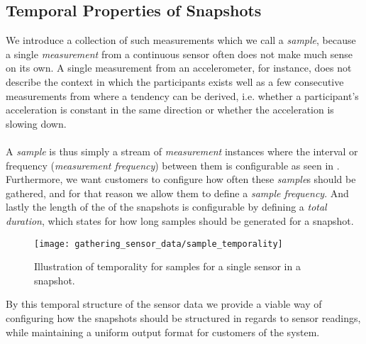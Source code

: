 
\subsection{Temporal Properties of Snapshots}
\label{sec:temporal_properties_of_snapshots}



We introduce a collection of such measurements which we call a \emph{sample}, because a single \emph{measurement} from a continuous sensor often does not make much sense on its own. A single measurement from an accelerometer, for instance, does not describe the context in which the participants exists well as a few consecutive measurements from where a tendency can be derived, i.e. whether a participant's acceleration is constant in the same direction or whether the acceleration is slowing down.
\\\\
A \emph{sample} is thus simply a stream of \emph{measurement} instances where the interval or frequency (\emph{measurement frequency}) between them is configurable as seen in . Furthermore, we want customers to configure how often these \emph{sample}s should be gathered, and for that reason we allow them to define a \emph{sample frequency}. And lastly the length of the of the snapshots is configurable by defining a \emph{total duration}, which states for how long samples should be generated for a snapshot.

\begin{figure}[!htbp]
    \centering
    \texttt{[image: gathering\_sensor\_data/sample\_temporality]}
    \caption{Illustration of temporality for samples for a single sensor in a snapshot.}
    \label{fig:sample_temporality}
\end{figure}
\FloatBarrier

By this temporal structure of the sensor data we provide a viable way of configuring how the snapshots should be structured in regards to sensor readings, while maintaining a uniform output format for customers of the system.
